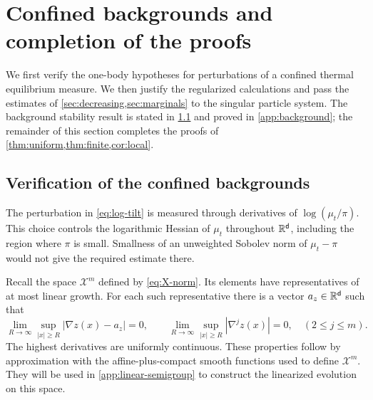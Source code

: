 \documentclass[11pt,reqno]{amsart}
\numberwithin{equation}{section}
\theoremstyle{plain}
\theoremstyle{remark}
\renewcommand{\d}{\mathsf{d}}\newcommand{\s}{\mathsf{s}}
\newcommand{\Xspace}{\mathcal X}
\begin{document}
\par\endgroup

\begingroup

\section{Confined backgrounds and completion of the proofs}\label{sec:confined-proofs}

We first verify the one-body hypotheses for perturbations of a confined thermal equilibrium measure. We then justify the regularized calculations and pass the estimates of \cref{sec:decreasing,sec:marginals} to the singular particle system. The background stability result is stated in \cref{sec:backgrounds} and proved in \cref{app:background}; the remainder of this section completes the proofs of \cref{thm:uniform,thm:finite,cor:local}.

\subsection{Verification of the confined backgrounds}\label{sec:backgrounds}

The perturbation in \eqref{eq:log-tilt} is measured through derivatives of $\log(\mu_t/\pi)$. This choice controls the logarithmic Hessian of $\mu_t$ throughout $\R^\d$, including the region where $\pi$ is small. Smallness of an unweighted Sobolev norm of $\mu_t-\pi$ would not give the required estimate there.

Recall the space $\Xspace^m$ defined by \eqref{eq:X-norm}. Its elements have representatives of at most linear growth. For each such representative there is a vector $a_z\in\R^\d$ such that
\begin{equation}\label{eq:X-tail-properties}
 \lim_{R\to\infty}\sup_{|x|\ge R}|\nabla z(x)-a_z|=0,
 \qquad
 \lim_{R\to\infty}\sup_{|x|\ge R}|\nabla^jz(x)|=0
 ,\quad(2\le j\le m).
\end{equation}
The highest derivatives are uniformly continuous. These properties follow by approximation with the affine-plus-compact smooth functions used to define $\Xspace^m$. They will be used in \cref{app:linear-semigroup} to construct the linearized evolution on this space.
\end{document}

